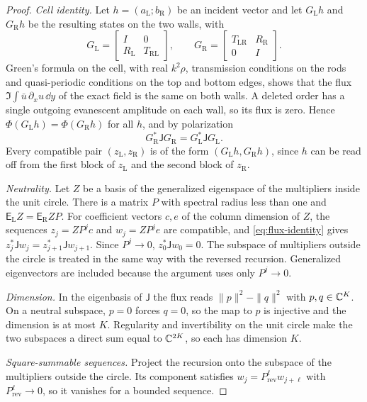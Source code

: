 \begin{proof}
\emph{Cell identity.} Let $h=(a_{\mathrm L};b_{\mathrm R})$ be an incident vector
and let $G_{\mathrm L}h$ and $G_{\mathrm R}h$ be the resulting states on the two
walls, with
\[
  G_{\mathrm L}=\begin{bmatrix}I&0\\ R_{\mathrm L}&T_{\mathrm{RL}}\end{bmatrix},\qquad
  G_{\mathrm R}=\begin{bmatrix}T_{\mathrm{LR}}&R_{\mathrm R}\\ 0&I\end{bmatrix}.
\]
Green's formula on the cell, with real $k^2\rho$, transmission conditions on
the rods and quasi-periodic conditions on the top and bottom edges, shows that
the flux $\Im\int\bar u\,\partial_xu\,\dd y$ of the exact field is the same on
both walls. A deleted order has a single outgoing evanescent amplitude on each
wall, so its flux is zero. Hence $\Phi(G_{\mathrm L}h)=\Phi(G_{\mathrm R}h)$ for all
$h$, and by polarization
\begin{equation}\label{eq:flux-identity}
  G_{\mathrm R}^*\mathsf JG_{\mathrm R}=G_{\mathrm L}^*\mathsf JG_{\mathrm L}.
\end{equation}
Every compatible pair $(z_{\mathrm L},z_{\mathrm R})$ is of the form
$(G_{\mathrm L}h,G_{\mathrm R}h)$, since $h$ can be read off from the first block of
$z_{\mathrm L}$ and the second block of $z_{\mathrm R}$.

\emph{Neutrality.} Let $Z$ be a basis of the generalized eigenspace of the
multipliers inside the unit circle. There is a matrix $P$ with spectral radius
less than one and $\mathsf E_{\mathrm L}Z=\mathsf E_{\mathrm R}ZP$. For coefficient vectors $c,e$ of the column dimension of $Z$, the
sequences $z_j=ZP^jc$ and $w_j=ZP^je$ are compatible, and
\eqref{eq:flux-identity} gives $z_j^*\mathsf Jw_j=z_{j+1}^*\mathsf Jw_{j+1}$. Since
$P^j\to0$, $z_0^*\mathsf Jw_0=0$. The subspace of multipliers outside the circle
is treated in the same way with the reversed recursion. Generalized
eigenvectors are included because the argument uses only $P^j\to0$.

\emph{Dimension.} In the eigenbasis of $\mathsf J$ the flux reads
$\|p\|^2-\|q\|^2$ with $p,q\in\mathbb{C}^K$. On a neutral subspace, $p=0$ forces
$q=0$, so the map to $p$ is injective and the dimension is at most $K$.
Regularity and invertibility on the unit circle make the two subspaces a
direct sum equal to $\mathbb{C}^{2K}$, so each has dimension $K$.

\emph{Square-summable sequences.} Project the recursion onto the subspace of
the multipliers outside the circle. Its component satisfies
$w_j=P_{\mathrm{rev}}^\ell w_{j+\ell}$ with $P_{\mathrm{rev}}^\ell\to0$, so it vanishes
for a bounded sequence.
\end{proof}

